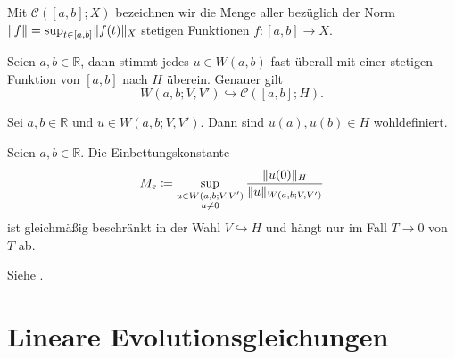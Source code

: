 \begin{Definition}
\label{definition:gl:stetige_funktionen}
    Mit $\mathcal C([a, b]; X)$ bezeichnen wir die Menge aller bezüglich der Norm $\lVert f\rVert = \sup_{t \in [a, b]} \lVert f(t)\rVert_{X}$ stetigen Funktionen $f \colon [a, b] \to X$.
\end{Definition}

\begin{Satz}
\label{satz:gl:einbettung_bochner_stetig}
    Seien $a, b \in \mathbb{R}$, dann stimmt jedes $u \in W(a, b)$ fast überall mit einer stetigen Funktion von $[a, b]$ nach $H$ überein.
    Genauer gilt
    \begin{equation}
        W(a, b; V, V') \hookrightarrow \mathcal C([a, b]; H).
    \end{equation}
\end{Satz}

\begin{Korollar}
\label{korollar:gl:spur_wohldefiniert}
    Sei $a, b \in \mathbb{R}$ und $u \in W(a, b; V, V')$.
    Dann sind $u(a), u(b) \in H$ wohldefiniert.
\end{Korollar}

\begin{Korollar}
\label{korollar:gl:einbettungskonstante_M_e}
    Seien $a, b \in \mathbb{R}$.
    Die Einbettungskonstante
    \begin{equation}
        \label{eq:gl:einbettungskonst_M_e}
        M_{e} \coloneqq \sup_{\substack{u\in W(a, b; V, V')\\u \neq 0}} \frac{\lVert u(0)\rVert_{H}}{\lVert u\rVert_{W(a, b; V, V')}}
    \end{equation}
    ist gleichmäßig beschränkt in der Wahl $V \hookrightarrow H$ und hängt nur im Fall $T \to 0$ von $T$ ab.

    \begin{Beweis}
        Siehe \textcite[Beweis zu Theorem XVIII.2.1]{Dautray:1992by}.
    \end{Beweis}
\end{Korollar}


\section{Lineare Evolutionsgleichungen} %
\label{sec:lineare_evolutionsgleichungen}
\label{sec:allgemeine_problemstellung}
\label{sec:raum_zeit_variationsformulierung}

